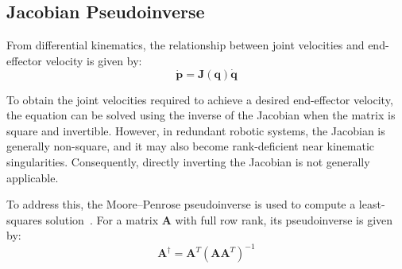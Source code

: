 \documentclass[12pt,a4paper]{article}
\begin{document}








\subsection*{Jacobian Pseudoinverse}

From differential kinematics, the relationship between joint
velocities and end-effector velocity is given by:
\begin{equation}
    \dot{\mathbf{p}} = \mathbf{J}(\mathbf{q})\dot{\mathbf{q}}
\end{equation}

To obtain the joint velocities required to achieve a desired
end-effector velocity, the equation can be solved using the
inverse of the Jacobian when the matrix is square and invertible.
However, in redundant robotic systems, the Jacobian is generally
non-square, and it may also become rank-deficient near kinematic
singularities. Consequently, directly inverting the Jacobian is
not generally applicable.

To address this, the Moore--Penrose pseudoinverse is used to compute a least-squares solution~\cite{buss2009}. For a matrix $\mathbf{A}$ with
full row rank, its pseudoinverse is given by:
\begin{equation}
    \mathbf{A}^{\dagger}
    = \mathbf{A}^{T}
    \left(\mathbf{A}\mathbf{A}^{T}\right)^{-1}
\end{equation}
\end{document}
